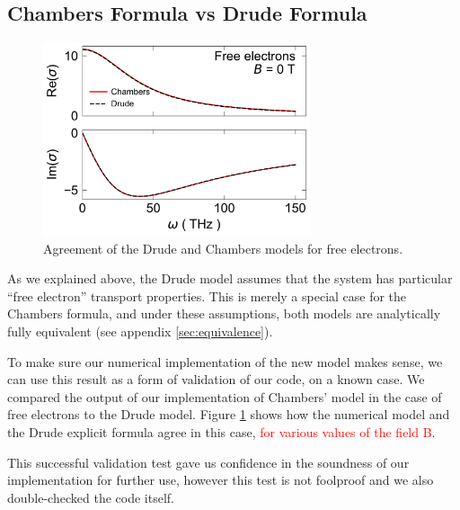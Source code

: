 \subsection{Chambers Formula vs Drude Formula}
\begin{figure}
    \centering
    \includegraphics[width=0.7\textwidth]{figures/free_electrons}
    \caption{Agreement of the Drude and Chambers models for free electrons.}
    \label{fig:free_electrons}
\end{figure}

As we explained above, %
the Drude model assumes that the system has particular ``free electron'' transport properties. 
This is merely a special case for the Chambers formula, 
and under these assumptions, 
both models are analytically fully equivalent (see appendix \ref{sec:equivalence}).

To make sure our numerical implementation of the new model makes sense, 
we can use this result as a form of validation of our code, on a known case. 
We compared the output of our implementation of Chambers' model in the case of free electrons to the Drude model. 
Figure \ref{fig:free_electrons} shows how the numerical model and the Drude explicit formula agree in this case,
\textcolor{red}{for various values of the field B}.

This successful validation test gave us confidence in the soundness of our implementation for further use, 
however this test is not foolproof and we also double-checked the code itself.